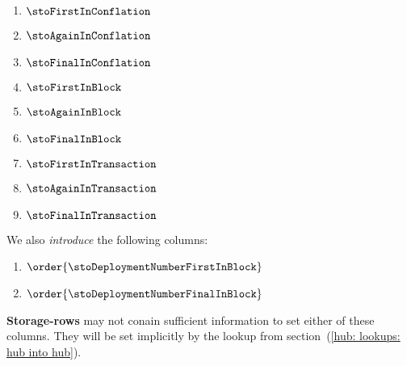 \begin{multicols}{3}
	\begin{enumerate}
		\item $\stoFirstInConflation$
		\item $\stoAgainInConflation$
		\item $\stoFinalInConflation$
		\item $\stoFirstInBlock$
		\item $\stoAgainInBlock$
		\item $\stoFinalInBlock$
		\item $\stoFirstInTransaction$
		\item $\stoAgainInTransaction$
		\item $\stoFinalInTransaction$
	\end{enumerate}
\end{multicols}
We also \emph{introduce} the following columns:
\begin{multicols}{2}
	\begin{enumerate}
		\item $\order{\stoDeploymentNumberFirstInBlock}$
		\item $\order{\stoDeploymentNumberFinalInBlock}$
	\end{enumerate}
\end{multicols}
\noindent \textbf{Storage-rows} may not conain sufficient information to set either of these columns.
They will be set implicitly by the lookup from section~(\ref{hub: lookups: hub into hub}).
